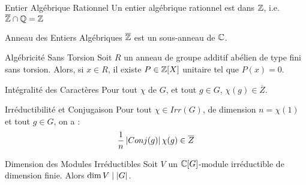 \documentclass{cours}
\begin{document}
\begin{propositionfr}{Entier Algébrique Rationnel}{}
    Un entier algébrique rationnel est dans $\mathbb{Z}$, i.e. $\overline{\mathbb{Z}} \cap \mathbb{Q} = \mathbb{Z}$
\end{propositionfr}

\begin{propositionfr}{Anneau des Entiers Algébriques}{}
    $\overline{\mathbb{Z}}$ est un sous-anneau de $\mathbb{C}$.
\end{propositionfr}

\begin{propositionfr}{Algébricité Sans Torsion}{}
    Soit $R$ un anneau de groupe additif abélien de type fini sans torsion. Alors, si $x \in R$, il existe $P \in \mathbb{Z}[X]$ unitaire tel que $P(x) = 0$.
\end{propositionfr}

\begin{propositionfr}{Intégralité des Caractères}{}
    Pour tout $\chi$ de $G$, et tout $g \in G$, $\chi(g) \in \overline{Z}$.
\end{propositionfr}

\begin{propositionfr}{Irréductibilité et Conjugaison}{}
    Pour tout $\chi \in Irr(G)$, de dimension $n = \chi(1)$ et tout $g \in G$, on a :
    \[
        \frac{1}{n}\left|Conj(g)\right| \chi(g) \in \overline{Z}
    \]
\end{propositionfr}

\begin{théorème}{Dimension des Modules Irréductibles}{}
    Soit $V$ un $\mathbb{C}[G]$-module irréductible de dimension finie. Alors $\dim V \mid \left|G\right|$.
\end{théorème}
\end{document}

